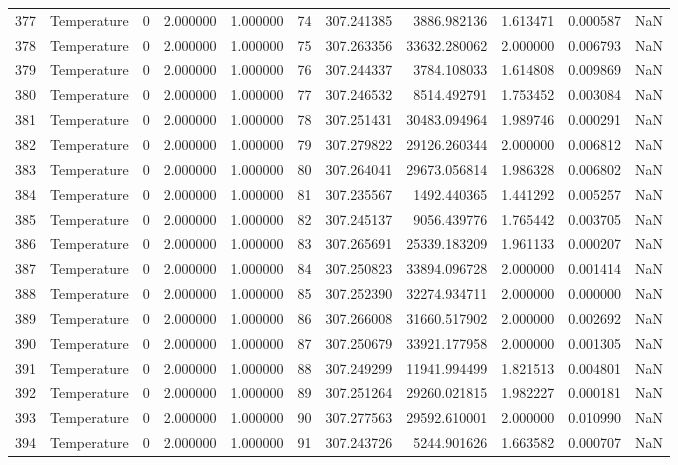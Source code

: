\begin{tabular}{llrrrrrrrrr}
377 & Temperature & 0 & 2.000000 & 1.000000 & 74 & 307.241385 & 3886.982136 & 1.613471 & 0.000587 & NaN \\
378 & Temperature & 0 & 2.000000 & 1.000000 & 75 & 307.263356 & 33632.280062 & 2.000000 & 0.006793 & NaN \\
379 & Temperature & 0 & 2.000000 & 1.000000 & 76 & 307.244337 & 3784.108033 & 1.614808 & 0.009869 & NaN \\
380 & Temperature & 0 & 2.000000 & 1.000000 & 77 & 307.246532 & 8514.492791 & 1.753452 & 0.003084 & NaN \\
381 & Temperature & 0 & 2.000000 & 1.000000 & 78 & 307.251431 & 30483.094964 & 1.989746 & 0.000291 & NaN \\
382 & Temperature & 0 & 2.000000 & 1.000000 & 79 & 307.279822 & 29126.260344 & 2.000000 & 0.006812 & NaN \\
383 & Temperature & 0 & 2.000000 & 1.000000 & 80 & 307.264041 & 29673.056814 & 1.986328 & 0.006802 & NaN \\
384 & Temperature & 0 & 2.000000 & 1.000000 & 81 & 307.235567 & 1492.440365 & 1.441292 & 0.005257 & NaN \\
385 & Temperature & 0 & 2.000000 & 1.000000 & 82 & 307.245137 & 9056.439776 & 1.765442 & 0.003705 & NaN \\
386 & Temperature & 0 & 2.000000 & 1.000000 & 83 & 307.265691 & 25339.183209 & 1.961133 & 0.000207 & NaN \\
387 & Temperature & 0 & 2.000000 & 1.000000 & 84 & 307.250823 & 33894.096728 & 2.000000 & 0.001414 & NaN \\
388 & Temperature & 0 & 2.000000 & 1.000000 & 85 & 307.252390 & 32274.934711 & 2.000000 & 0.000000 & NaN \\
389 & Temperature & 0 & 2.000000 & 1.000000 & 86 & 307.266008 & 31660.517902 & 2.000000 & 0.002692 & NaN \\
390 & Temperature & 0 & 2.000000 & 1.000000 & 87 & 307.250679 & 33921.177958 & 2.000000 & 0.001305 & NaN \\
391 & Temperature & 0 & 2.000000 & 1.000000 & 88 & 307.249299 & 11941.994499 & 1.821513 & 0.004801 & NaN \\
392 & Temperature & 0 & 2.000000 & 1.000000 & 89 & 307.251264 & 29260.021815 & 1.982227 & 0.000181 & NaN \\
393 & Temperature & 0 & 2.000000 & 1.000000 & 90 & 307.277563 & 29592.610001 & 2.000000 & 0.010990 & NaN \\
394 & Temperature & 0 & 2.000000 & 1.000000 & 91 & 307.243726 & 5244.901626 & 1.663582 & 0.000707 & NaN \\

\end{tabular}
